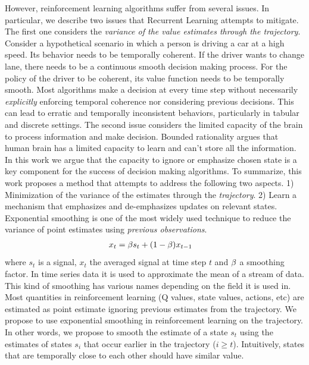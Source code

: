 However, reinforcement learning algorithms suffer from several issues. In particular, we describe two issues that Recurrent Learning attempts to mitigate. The first one considers the \emph{variance of the value estimates through the trajectory}. Consider a hypothetical scenario in which a person is driving a car at a high speed. Its behavior needs to be temporally coherent. If the driver wants to change lane, there needs to be a continuous smooth decision making process. For the policy of the driver to be coherent, its value function needs to be temporally smooth. Most algorithms make a decision at every time step without necessarily \emph{explicitly} enforcing temporal coherence nor considering previous decisions. This can lead to erratic and temporally inconsistent behaviors, particularly in tabular and discrete settings. The second issue considers the limited capacity of the brain to process information and make decision. Bounded rationality argues that human brain has a limited capacity to learn and can't store all the information. In this work we argue that the capacity to ignore or emphasize chosen state is a key component for the success of decision making algorithms.  
To summarize, this work proposes a method that attempts to address the following two aspects. 1) Minimization of the variance of the estimates through the \emph{trajectory}. 2) Learn a mechanism that emphasizes and de-emphasizes updates on relevant states.\\
Exponential smoothing \cite{gardner1985exponential} is one of the most widely used technique to reduce the variance of point estimates using \emph{previous observations}.
\begin{equation}
\begin{split}\label{smoothing}
    x_t &= \beta s_t + (1-\beta) x_{t-1}
\end{split}
\end{equation}
where $s_t$ is a signal, $x_t$ the averaged signal at time step $t$ and $\beta$ a smoothing factor.
In time series data it is used to approximate the mean of a stream of data. This kind of smoothing has various names \cite{polyak1992acceleration,kingma2014adam} depending on the field it is used in.  Most quantities in reinforcement learning (Q values, state values, actions, etc) are estimated as point estimate ignoring previous estimates from the trajectory. We propose to use exponential smoothing in reinforcement learning on the trajectory. In other words, we propose to smooth the estimate of a state $s_t$ using the estimates of states $s_i$ that occur earlier in the trajectory ($i\geq t$). Intuitively, states that are temporally close to each other should have similar value.\\
